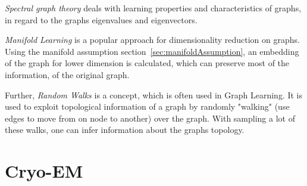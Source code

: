 \textit{Spectral graph theory}\cite{SpectralGraphTheory} deals with learning properties and characteristics of graphs, in regard to
the graphs eigenvalues and eigenvectors. 

\textit{Manifold Learning }\cite{ManifoldLearning} is a popular approach for dimensionality reduction on graphs. 
Using the manifold assumption section~\ref{sec:manifoldAssumption}, an embedding of the graph for lower dimension is calculated,
which can preserve most of the information, of the original graph.

Further, \textit{Random Walks} is a concept, which is often used in Graph Learning. 
It is used to exploit topological information of a graph by randomly "walking" (use edges to move from on node to another)
over the graph. With sampling a lot of these walks, one can infer information about the graphs topology.


\section{Cryo-EM}



